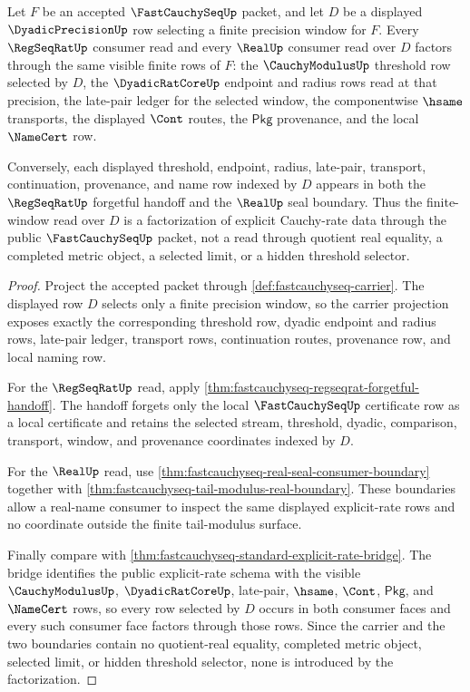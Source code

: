 \begin{theorem}
\label{thm:fastcauchyseq-modulus-precision-window-factorization}
Let $F$ be an accepted $\FastCauchySeqUp$ packet, and let $D$ be a displayed
$\DyadicPrecisionUp$ row selecting a finite precision window for $F$. Every
$\RegSeqRatUp$ consumer read and every $\RealUp$ consumer read over $D$ factors
through the same visible finite rows of $F$: the $\CauchyModulusUp$ threshold
row selected by $D$, the $\DyadicRatCoreUp$ endpoint and radius rows read at
that precision, the late-pair ledger for the selected window, the componentwise
$\hsame$ transports, the displayed $\Cont$ routes, the $\mathsf{Pkg}$
provenance, and the local $\NameCert$ row.

Conversely, each displayed threshold, endpoint, radius, late-pair, transport,
continuation, provenance, and name row indexed by $D$ appears in both the
$\RegSeqRatUp$ forgetful handoff and the $\RealUp$ seal boundary. Thus the
finite-window read over $D$ is a factorization of explicit Cauchy-rate data
through the public $\FastCauchySeqUp$ packet, not a read through quotient real
equality, a completed metric object, a selected limit, or a hidden threshold
selector.
\end{theorem}
\begin{proof}
Project the accepted packet through \autoref{def:fastcauchyseq-carrier}. The
displayed row $D$ selects only a finite precision window, so the carrier
projection exposes exactly the corresponding threshold row, dyadic endpoint
and radius rows, late-pair ledger, transport rows, continuation routes,
provenance row, and local naming row.

For the $\RegSeqRatUp$ read, apply
\autoref{thm:fastcauchyseq-regseqrat-forgetful-handoff}. The handoff forgets
only the local $\FastCauchySeqUp$ certificate row as a local certificate and
retains the selected stream, threshold, dyadic, comparison, transport, window,
and provenance coordinates indexed by $D$.

For the $\RealUp$ read, use
\autoref{thm:fastcauchyseq-real-seal-consumer-boundary} together with
\autoref{thm:fastcauchyseq-tail-modulus-real-boundary}. These boundaries allow
a real-name consumer to inspect the same displayed explicit-rate rows and no
coordinate outside the finite tail-modulus surface.

Finally compare with
\autoref{thm:fastcauchyseq-standard-explicit-rate-bridge}. The bridge identifies
the public explicit-rate schema with the visible $\CauchyModulusUp$,
$\DyadicRatCoreUp$, late-pair, $\hsame$, $\Cont$, $\mathsf{Pkg}$, and
$\NameCert$ rows, so every row selected by $D$ occurs in both consumer faces
and every such consumer face factors through those rows. Since the carrier and
the two boundaries contain no quotient-real equality, completed metric object,
selected limit, or hidden threshold selector, none is introduced by the
factorization.
\end{proof}

